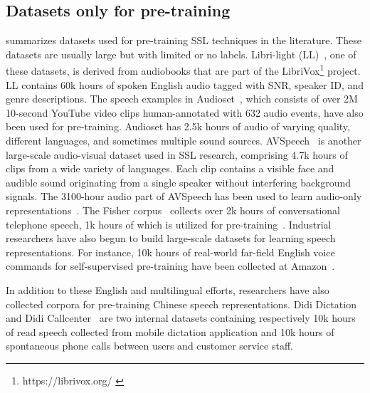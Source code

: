 \subsection{Datasets only for pre-training} 
 summarizes datasets used for pre-training SSL techniques
in the literature. These datasets are usually large but with limited or no
labels. Libri-light (LL)~\cite{kahn2020libri}, one of these datasets, is
derived from audiobooks that are part of the
LibriVox\footnote{https://librivox.org/ \label{librivox}} project. LL contains
60k hours of spoken English audio tagged with SNR, speaker ID, and genre
descriptions. The speech examples in Audioset~\cite{gemmeke2017audio}, which
consists of over 2M 10-second YouTube video clips human-annotated with 632
audio events, have also been used for pre-training. Audioset has 2.5k hours
of audio of varying quality, different languages, and sometimes multiple sound
sources. AVSpeech~\cite{ephrat2018looking} is another large-scale audio-visual
dataset used in SSL research, comprising 4.7k hours of clips from a wide
variety of languages. 
Each clip contains a visible face and audible sound originating from a single
speaker without interfering background signals. The 3100-hour audio part of
AVSpeech has been used to learn audio-only 
representations~\cite{kawakami2020learning}. The Fisher corpus~\cite{cieri2004fisher} collects
over 2k hours of conversational telephone speech, 1k hours of which is utilized
for pre-training~\cite{jiang_further_2021}. Industrial researchers have also
begun to build large-scale datasets for learning speech representations.
For instance, 10k hours of real-world far-field English voice commands for
self-supervised pre-training have been collected at 
Amazon~\cite{sadhu_wav2vec-c_2021}. 

In addition to these English and multilingual efforts, researchers have also
collected corpora for pre-training Chinese speech representations. Didi Dictation
and Didi Callcenter~\cite{jiang2019improving, jiang_further_2021} are two
internal datasets containing respectively 10k hours of read speech collected
from mobile dictation application and 10k hours of spontaneous phone calls
between users and customer service staff.

